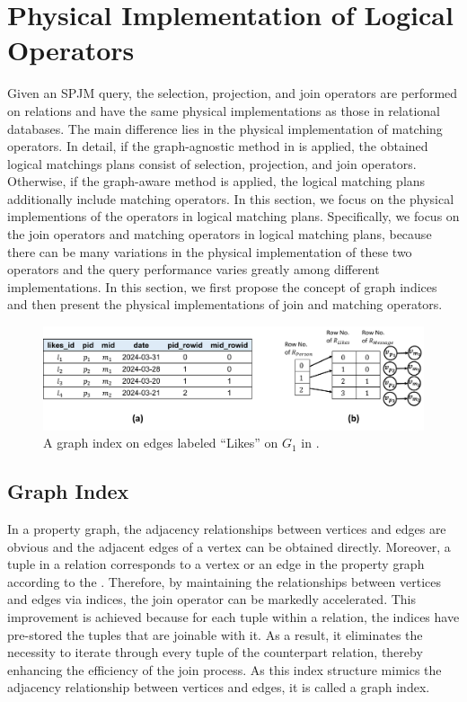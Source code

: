 \section{Physical Implementation of Logical Operators}

Given an SPJM query, the selection, projection, and join operators are performed on relations and have the same physical implementations as those in relational databases.
The main difference lies in the physical implementation of matching operators.
In detail, if the graph-agnostic method in  is applied, the obtained logical matchings plans consist of selection, projection, and join operators.
Otherwise, if the graph-aware method is applied, the logical matching plans additionally include matching operators.
In this section, we focus on the physical implementions of the operators in logical matching plans.
Specifically, we focus on the join operators and matching operators in logical matching plans, because there can be many variations in the physical implementation of these two operators and the query performance varies greatly among different implementations. 
In this section, we first propose the concept of graph indices and then present the physical implementations of join and matching operators.

\begin{figure}
    \centering
    \includegraphics[width=.8\linewidth]{./figures/graph-index-likes.pdf}
    \caption{A graph index on edges labeled ``Likes'' on $G_1$ in .}
    \label{fig:graph-index}
\end{figure}

\subsection{Graph Index}
\label{sec:graph-index}

In a property graph, the adjacency relationships between vertices and edges are obvious and the adjacent edges of a vertex can be obtained directly.
Moreover, a tuple in a relation corresponds to a vertex or an edge in the property graph according to the \rgmapping.
Therefore, by maintaining the relationships between vertices and edges via indices, the join operator can be markedly accelerated. 
This improvement is achieved because for each tuple within a relation, the indices have pre-stored the tuples that are joinable with it. 
As a result, it eliminates the necessity to iterate through every tuple of the counterpart relation, thereby enhancing the efficiency of the join process.
As this index structure mimics the adjacency relationship between vertices and edges, it is called a graph index.

